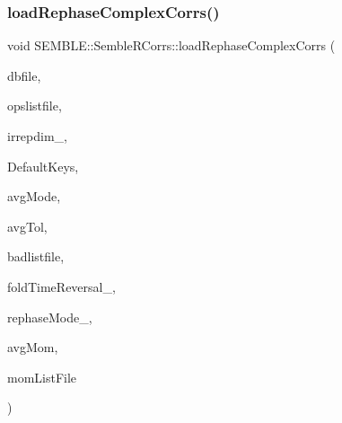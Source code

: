 \subsubsection{\texorpdfstring{loadRephaseComplexCorrs()}{loadRephaseComplexCorrs()}\hspace{0.1cm}{\footnotesize\ttfamily [1/2]}}
{\footnotesize\ttfamily void S\+E\+M\+B\+L\+E\+::\+Semble\+R\+Corrs\+::load\+Rephase\+Complex\+Corrs (\begin{DoxyParamCaption}\item[{const string \&}]{dbfile,  }\item[{const string \&}]{opslistfile,  }\item[{int}]{irrepdim\+\_\+,  }\item[{F\+F\+::\+Key\+Hadron2\+Pt\+Corr\+\_\+t}]{Default\+Keys,  }\item[{const string \&}]{avg\+Mode,  }\item[{double}]{avg\+Tol,  }\item[{string const \&}]{badlistfile,  }\item[{const string \&}]{fold\+Time\+Reversal\+\_\+,  }\item[{const string \&}]{rephase\+Mode\+\_\+,  }\item[{bool}]{avg\+Mom,  }\item[{const string \&}]{mom\+List\+File }\end{DoxyParamCaption})}

